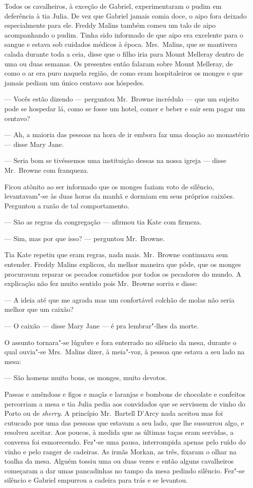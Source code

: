 Todos os cavalheiros, à exceção de Gabriel, experimentaram o pudim em
deferência à tia Julia.  De vez que Gabriel jamais comia doce, o aipo fora
deixado especialmente para ele.  Freddy Malins também comeu um talo de aipo
acompanhando o pudim.  Tinha sido informado de que aipo era excelente para o
sangue e estava sob cuidados médicos à época.  Mrs.~Malins, que se mantivera
calada durante toda a ceia, disse que o filho iria para Mount Melleray dentro
de uma ou duas semanas.  Os presentes então falaram sobre Mount Melleray, de
como o ar era puro naquela região, de como eram hospitaleiros os monges e que       \enlargethispage{.4em}
jamais pediam um único centavo aos hóspedes.

--- Vocês estão dizendo --- perguntou Mr.~Browne incrédulo --- que um sujeito
pode se hospedar lá, como se fosse um hotel, comer e beber e sair sem pagar um
centavo?

--- Ah, a maioria das pessoas na hora de ir embora faz uma doação ao monastério
--- disse Mary Jane.

--- Seria bom se tivéssemos uma instituição dessas na nossa igreja --- disse
Mr.~Browne com franqueza.

Ficou atônito ao ser informado que os monges faziam voto de silêncio,
levantavam"-se às duas horas da manhã e dormiam em seus próprios caixões.
Perguntou a razão de tal comportamento.

--- São as regras da congregação --- afirmou tia Kate com firmeza.

--- Sim, mas por que isso? --- perguntou Mr.~Browne.

Tia Kate repetiu que eram regras, nada mais.  Mr.~Browne continuava sem
entender.  Freddy Malins explicou, da melhor maneira que pôde, que os monges
procuravam reparar os pecados cometidos por todos os pecadores do mundo.  A
explicação não fez muito sentido pois Mr.~Browne sorriu e disse:

--- A ideia até que me agrada mas um confortável colchão de molas não seria
melhor que um caixão?

--- O caixão --- disse Mary Jane --- é pra lembrar"-lhes da morte.

O assunto tornara"-se lúgubre e fora enterrado no silêncio da mesa, durante o
qual ouvia"-se Mrs.~Malins dizer, à meia"-voz, à pessoa que estava a seu lado na
mesa:

--- São homens muito bons, os monges, muito devotos.

Passas e amêndoas e figos e maçãs e laranjas e bombons de chocolate e confeitos
percorriam a mesa e tia Julia pedia aos convidados que se servissem de vinho do
Porto ou de \textit{sherry}.  A princípio Mr.~Bartell D’Arcy nada aceitou mas foi
cutucado por uma das pessoas que estavam a seu lado, que lhe sussurrou algo, e
resolveu aceitar.  Aos poucos, à medida que as últimas taças eram servidas, a
conversa foi esmorecendo.  Fez"-se uma pausa, interrompida apenas pelo ruído do
vinho e pelo ranger de cadeiras.  As irmãs Morkan, as três, fixaram o olhar na
toalha da mesa.  Alguém tossiu uma ou duas vezes e então alguns cavalheiros
começaram a dar umas pancadinhas no tampo da mesa pedindo silêncio.  Fez"-se
silêncio e Gabriel empurrou a cadeira para trás e se levantou.

